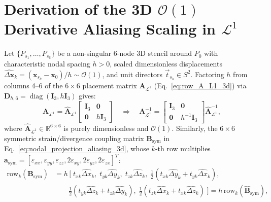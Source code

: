 \documentclass[preprint,12pt]{elsarticle}
\newcommand{\R}{\mathbb{R}}
\begin{document}
\section{Derivation of the 3D $\mathcal{O}(1)$ Derivative Aliasing Scaling in $\mathcal{L}^1$}
\label{app:aliasing_proof_3d}

Let $\{P_{s_1}, \dots, P_{s_6}\}$ be a non-singular 6-node 3D stencil around $P_0$ with characteristic nodal spacing $h > 0$, scaled dimensionless displacements $\widehat{\Delta\mathbf{x}}_k = (\mathbf{x}_{s_k} - \mathbf{x}_0)/h \sim \mathcal{O}(1)$, and unit directors $\vec{t}_{s_k} \in S^2$. Factoring $h$ from columns 4--6 of the $6\times 6$ placement matrix $\mathbf{A}_{\mathcal{L}^1}$ (Eq.~\eqref{eq:row_A_L1_3d}) via $\mathbf{D}_{h,6} = \operatorname{diag}(\mathbf{I}_3, h\mathbf{I}_3)$ gives:
\begin{equation}
    \mathbf{A}_{\mathcal{L}^1} = \widehat{\mathbf{A}}_{\mathcal{L}^1} \begin{bmatrix} \mathbf{I}_3 & \mathbf{0} \\ \mathbf{0} & h\mathbf{I}_3 \end{bmatrix} \quad \Longrightarrow \quad \mathbf{A}_{\mathcal{L}^1}^{-1} = \begin{bmatrix} \mathbf{I}_3 & \mathbf{0} \\ \mathbf{0} & h^{-1}\mathbf{I}_3 \end{bmatrix} \widehat{\mathbf{A}}_{\mathcal{L}^1}^{-1},
    \label{eq:app_A_L1_scaling}
\end{equation}
where $\widehat{\mathbf{A}}_{\mathcal{L}^1} \in \R^{6\times 6}$ is purely dimensionless and $\mathcal{O}(1)$. Similarly, the $6\times 6$ symmetric strain/divergence coupling matrix $\mathbf{B}_{\text{sym}}$ in Eq.~\eqref{eq:nodal_projection_aliasing_3d}, whose $k$-th row multiplies $\mathbf{a}_{\text{sym}} = [\varepsilon_{xx}, \varepsilon_{yy}, \varepsilon_{zz}, 2\varepsilon_{xy}, 2\varepsilon_{yz}, 2\varepsilon_{zx}]^T$:
\begin{equation}
\begin{aligned}
    \text{row}_k(\mathbf{B}_{\text{sym}}) &= h\,\Big[\; t_{xk}\widehat{\Delta x}_k, \; t_{yk}\widehat{\Delta y}_k, \; t_{zk}\widehat{\Delta z}_k, \; \tfrac{1}{2}(t_{xk}\widehat{\Delta y}_k + t_{yk}\widehat{\Delta x}_k), \\
    &\qquad \tfrac{1}{2}(t_{yk}\widehat{\Delta z}_k + t_{zk}\widehat{\Delta y}_k), \; \tfrac{1}{2}(t_{zk}\widehat{\Delta x}_k + t_{xk}\widehat{\Delta z}_k) \;\Big] = h\,\text{row}_k(\widehat{\mathbf{B}}_{\text{sym}}),
\end{aligned}
\label{eq:app_B_sym_scaling}
\end{equation}
\end{document}
